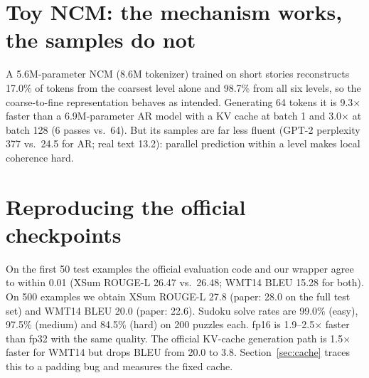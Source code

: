 \documentclass[11pt]{article}
\begin{document}
\section{Toy NCM: the mechanism works, the samples do not}\label{sec:toy}
A 5.6M-parameter NCM (8.6M tokenizer) trained on short stories reconstructs 17.0\% of
tokens from the coarsest level alone and 98.7\% from all six levels, so the coarse-to-fine
representation behaves as intended. Generating 64 tokens it is 9.3$\times$ faster than a
6.9M-parameter AR model with a KV cache at batch 1 and 3.0$\times$ at batch 128 (6 passes vs.\
64). But its samples are far less fluent (GPT-2 perplexity 377 vs.\ 24.5 for AR; real text
13.2): parallel prediction within a level makes local coherence hard.

\section{Reproducing the official checkpoints}
On the first 50 test examples the official evaluation code and our wrapper agree to within
0.01 (XSum ROUGE-L 26.47 vs.\ 26.48; WMT14 BLEU 15.28 for both). On 500 examples we obtain XSum ROUGE-L
27.8 (paper: 28.0 on the full test set) and WMT14 BLEU 20.0 (paper: 22.6). Sudoku solve
rates are 99.0\% (easy), 97.5\% (medium) and 84.5\% (hard) on 200 puzzles each. fp16 is
1.9--2.5$\times$ faster than fp32 with the same quality. The official KV-cache generation path
is 1.5$\times$ faster for WMT14 but drops BLEU from 20.0 to 3.8. Section~\ref{sec:cache}
traces this to a padding bug and measures the fixed cache.
\end{document}
